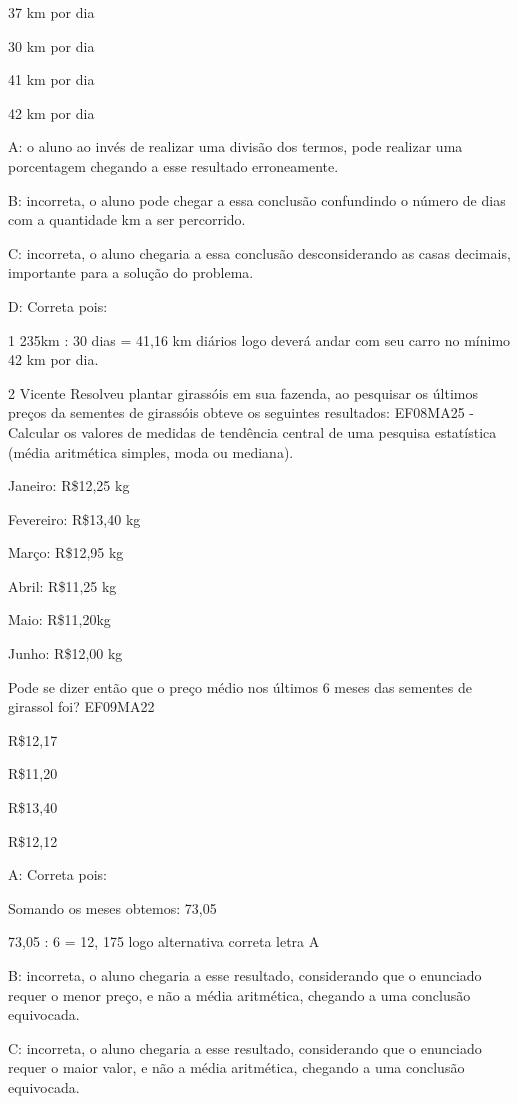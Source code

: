 \item 37 km por dia
\item 30 km por dia
\item 41 km por dia
\item 42 km por dia

A: o aluno ao invés de realizar uma divisão dos termos, pode realizar
uma porcentagem chegando a esse resultado erroneamente.

B: incorreta, o aluno pode chegar a essa conclusão confundindo o número
de dias com a quantidade km a ser percorrido.

C: incorreta, o aluno chegaria a essa conclusão desconsiderando as casas
decimais, importante para a solução do problema.

D: Correta pois:

1 235km : 30 dias = 41,16 km diários logo deverá andar com seu carro no
mínimo 42 km por dia.

\num{2} Vicente Resolveu plantar girassóis em sua fazenda, ao pesquisar os
últimos preços da sementes de girassóis obteve os seguintes resultados:
EF08MA25 - Calcular os valores de medidas de tendência central de uma
pesquisa estatística (média aritmética simples, moda ou mediana).

Janeiro: R\$12,25 kg

Fevereiro: R\$13,40 kg

Março: R\$12,95 kg

Abril: R\$11,25 kg

Maio: R\$11,20kg

Junho: R\$12,00 kg

Pode se dizer então que o preço médio nos últimos 6 meses das sementes
de girassol foi? EF09MA22

\item R\$12,17
\item R\$11,20
\item R\$13,40
\item R\$12,12

A: Correta pois:

Somando os meses obtemos: 73,05

73,05 : 6 = 12, 175 logo alternativa correta letra A

B: incorreta, o aluno chegaria a esse resultado, considerando que o
enunciado requer o menor preço, e não a média aritmética, chegando a uma
conclusão equivocada.

C: incorreta, o aluno chegaria a esse resultado, considerando que o
enunciado requer o maior valor, e não a média aritmética, chegando a uma
conclusão equivocada.

